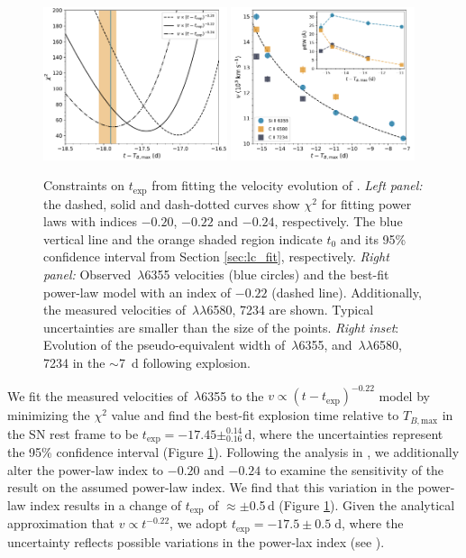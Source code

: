\documentclass[twocolumn]{aastex61}
\begin{document}
\begin{figure}[!thb]
  \centering
  \includegraphics[width=0.48\textwidth]{Chi2.pdf}
  \includegraphics[width=0.48\textwidth]{VelocityPlot.pdf}
  \caption{Constraints on $t_\mathrm{exp}$ from fitting the velocity
    evolution of .
    \textit{Left panel:} the dashed, solid and dash-dotted curves 
    show $\chi^2$ for fitting power laws with
    indices $-0.20$, $-0.22$ and $-0.24$, respectively. The blue
    vertical line and the orange shaded region indicate $t_0$ and 
    its 95\% confidence interval from Section
    \ref{sec:lc_fit}, respectively.
    \textit{Right panel:} Observed \,$\lambda$6355
    velocities (blue circles) and the best-fit power-law model
     with an index of $-0.22$ (dashed line). Additionally, the 
     measured velocities of \,$\lambda\lambda$6580, 7234 
     are shown. Typical uncertainties are smaller than the size of 
     the points. \textit{Right inset}: Evolution of the 
     pseudo-equivalent width of \,$\lambda$6355, and 
     \,$\lambda\lambda$6580, 7234 in the $\sim$7~d    
     following explosion.}
  \label{fig:velocity_t_exp}
\end{figure}

We fit the measured velocities of \,$\lambda$6355 to the
$v\propto(t-t_\mathrm{exp})^{-0.22}$ model by minimizing the $\chi^2$ value
and find the best-fit explosion time relative to $T_{B,\mathrm{max}}$ in the
SN rest frame to be $t_\mathrm{exp} = -17.45 \pm ^{0.14}_{0.16}\,\textrm{d}$,
where the uncertainties represent the 95\% confidence interval (Figure
\ref{fig:velocity_t_exp}). Following the analysis in
\citet{2014ApJ...784...85P}, we additionally alter the power-law index to
$-0.20$ and $-0.24$ to examine the sensitivity of the result on the assumed
power-law index. We find that this variation in the power-law index results in
a change of $t_\mathrm{exp}$ of $\approx\pm$0.5\,d (Figure
\ref{fig:velocity_t_exp}). Given the analytical approximation that $v \propto
t^{-0.22}$, we adopt $t_\mathrm{exp} = -17.5 \pm 0.5 \; \mathrm{d}$, where the
uncertainty reflects possible variations in the power-lax index (see
\citealt{2014ApJ...784...85P}).
\end{document}

